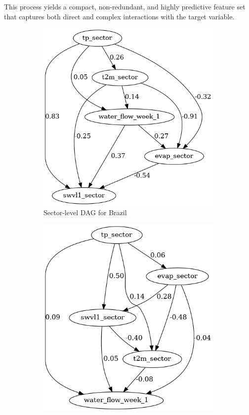\documentclass[ruler]{CUP-JNL-EDS}%
\begin{document}
\noindent This process yields a compact, non-redundant, and highly predictive feature set that captures both direct and complex interactions with the target variable.
\begin{figure}[!htp]
    \centering
    \begin{subfigure}[b]{0.48\textwidth}
        \includegraphics[width=\textwidth]{./assets/images/Brazil_sector_DAG.png}
        \caption{Sector-level DAG for Brazil}
        \label{fig:dag_brazil}
    \end{subfigure}
    \hfill
    \begin{subfigure}[b]{0.48\textwidth}
        \includegraphics[width=\textwidth]{./assets/images/france_sector_DAG.png}

\end{subfigure}
\end{figure}
\end{document}
